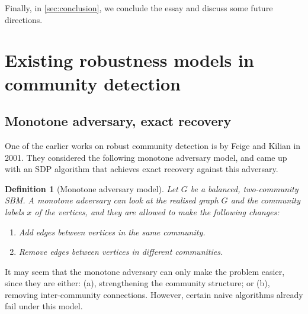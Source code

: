 \documentclass[11pt, titlepage]{article} %
\numberwithin{equation}{section}
\newtheorem{definition}{Definition}
\theoremstyle{definition}
\numberwithin{theorem}{section}
\numberwithin{lemma}{section}
\numberwithin{corollary}{section}
\numberwithin{proposition}{section}
\numberwithin{definition}{section}
\numberwithin{remark}{section}
\begin{document}
Finally, in \cref{sec:conclusion}, we conclude the essay and discuss some future directions.
\section{Existing robustness models in community detection}
\label{sec:existing.robustness}
\subsection{Monotone adversary, exact recovery}
One of the earlier works on robust community detection is by Feige and Kilian \cite{FK01} in 2001.
They considered the following monotone adversary model, and came up with an SDP algorithm that
achieves exact recovery against this adversary.
\begin{definition}[Monotone adversary model]
\label{def:monotone}
Let $G$ be a balanced, two-community SBM. A monotone adversary can look at the realised graph $G$
and the community labels $x$ of the vertices, and they are allowed to make the following changes:
\begin{enumerate}
    \item[(a)] Add edges between vertices in the same community.
    \item[(b)] Remove edges between vertices in different communities.
\end{enumerate}
\end{definition}
It may seem that the monotone adversary can only make the problem easier, since they are either:
(a), strengthening the community structure; or (b), removing inter-community connections. However,
certain naive algorithms already fail under this model.
\end{document}
